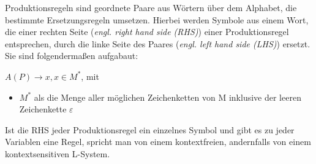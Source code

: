 Produktionsregeln sind geordnete Paare aus Wörtern über dem Alphabet, die bestimmte Ersetzungsregeln umsetzen.
Hierbei werden Symbole aus einem Wort, die einer rechten Seite (\textit{engl. right hand side (RHS)}) einer
Produktionsregel entsprechen, durch die linke Seite des Paares (\textit{engl. left hand side (LHS)}) ersetzt.
Sie sind folgendermaßen aufgabaut:
\begin{center}
    $A(P)\rightarrow x,x\in M^*$, mit
    \begin{itemize}
        \item $M^*$ als die Menge aller möglichen Zeichenketten von M inklusive der leeren Zeichenkette $\varepsilon$
    \end{itemize}
\end{center}
Ist die RHS jeder Produktionsregel ein einzelnes Symbol und gibt es zu jeder Variablen eine Regel, spricht man
von einem kontextfreien, andernfalls von einem kontextsensitiven L-System.

